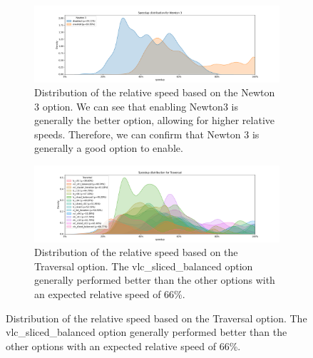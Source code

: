 \begin{figure}[H]
  \centering
  \begin{subfigure}{\columnwidth}

    \includegraphics[width=\columnwidth,trim={1cm 0 2cm 1.5cm},clip]{figures/DataAnalytics/speedup_Newton 3.png}
    \caption[Speedup density plot based on the Newton 3 option]{Distribution of the relative speed based on the Newton 3 option. We can see that enabling Newton3 is generally the better option, allowing for higher relative speeds. Therefore, we can confirm that Newton 3 is generally a good option to enable.}
    \label{fig:inputAnalysisDensityNewton3}
  \end{subfigure}

  \vspace{0.2cm}

  \begin{subfigure}{\columnwidth}
    \centering
    \includegraphics[width=\columnwidth,trim={1cm 0 2cm 1.5cm},clip]{figures/DataAnalytics/speedup_Traversal.png}
    \caption[Speedup density plot based on the Traversal option]{Distribution of the relative speed based on the Traversal option.  The vlc\_sliced\_balanced option generally performed better than the other options with an expected relative speed of 66\%.}
    \label{fig:inputAnalysisDensityTraversal}
  \end{subfigure}

  \vspace{0.2cm}


\end{figure}
